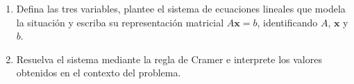 \documentclass[11pt,a4paper]{article}
\begin{document}
\begin{enumerate}
\begin{enumerate}
    \item Defina las tres variables, plantee el sistema de ecuaciones lineales que modela la situación y escriba su representación matricial $A\mathbf{x}=b$, identificando $A$, $\mathbf{x}$ y $b$.
    \item Resuelva el sistema mediante la regla de Cramer e interprete los valores obtenidos en el contexto del problema.
\end{enumerate}
\end{enumerate}
\end{document}

